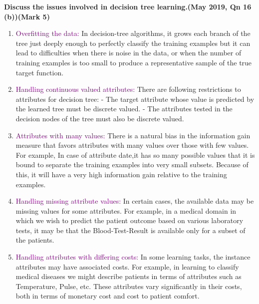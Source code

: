 
\textbf{\textcolor{LightMagenta}{Discuss the issues involved in decision tree learning.(May 2019, Qn 16 (b))\hfill (Mark 5)}} \\[5pt]
\begin{enumerate}
\item \textcolor{purple}{Overfitting the data:}
 In decision-tree algorithms, it grows each branch of the tree just deeply enough to perfectly classify the training examples but it can lead to difficulties when there is noise in the data, or when the number of training examples is too small to produce a representative sample of the true target function. 
     \item \textcolor{purple}{Handling continuous valued attributes:}
      There are following restrictions to attributes for decision tree:
   - The target attribute whose value is predicted by the learned tree must be discrete            valued.
   - The attributes tested in the decision nodes of the tree must also be discrete valued.
   
    \item \textcolor{purple}{Attributes with many values:}
    There is a natural bias in the information gain measure that favors attributes with many values over those with few values.
For example, In case of attribute date,it has so many possible values that it is bound to separate the training examples into very small subsets. Because of this, it will have a very high information gain relative to the training examples.
    \item \textcolor{purple}{Handling missing attribute values:}
    In certain cases, the available data may be missing values for some attributes. For example, in a medical domain in which we wish to predict the patient outcome based on various laboratory tests, it may be that the Blood-Test-Result is available only for a subset of the patients.
    \item \textcolor{purple}{Handling attributes with differing costs:}
    In some learning tasks, the instance attributes may have associated costs. For example, in learning to classify medical diseases we might describe patients in terms of attributes such as Temperature, Pulse, etc. These attributes vary significantly in their costs, both in terms of monetary cost and cost to patient comfort.
\end{enumerate}


 



 
 


 
        
